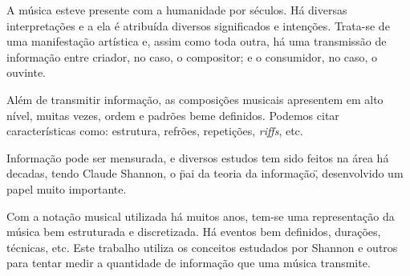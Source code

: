 A música esteve presente com a humanidade por séculos. Há diversas interpretações e a ela é atribuída diversos significados e intenções. Trata-se de uma manifestação artística e, assim como toda outra, há uma transmissão de informação entre criador, no caso, o compositor; e o consumidor, no caso, o ouvinte.

Além de transmitir informação, as composições musicais apresentem em alto nível, muitas vezes, ordem e padrões beme definidos. Podemos citar características como: estrutura, refrões, repetições, \textit{riffs}, etc.

Informação pode ser mensurada, e diversos estudos tem sido feitos na área há decadas, tendo Claude Shannon, o \"pai da teoria da informação\", desenvolvido um papel muito importante. \cite{shannon}

Com a notação musical utilizada há muitos anos, tem-se uma representação da música bem estruturada e discretizada. Há eventos bem definidos, durações, técnicas, etc. Este trabalho utiliza os conceitos estudados por Shannon e outros para tentar medir a quantidade de informação que uma música transmite.





    
    
    
    